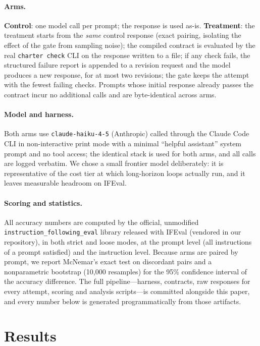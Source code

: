\documentclass{article}
\begin{document}
\paragraph{Arms.} \textbf{Control}: one model call per prompt; the response is
used as-is. \textbf{Treatment}: the treatment starts from the \emph{same}
control response (exact pairing, isolating the effect of the gate from sampling
noise); the compiled contract is evaluated by the real \texttt{charter check}
CLI on the response written to a file; if any check fails, the structured
failure report is appended to a revision request and the model produces a new
response, for at most two revisions; the gate keeps the attempt with the fewest
failing checks. Prompts whose initial response already passes the contract incur
no additional calls and are byte-identical across arms.

\paragraph{Model and harness.} Both arms use \texttt{claude-haiku-4-5} (Anthropic)
called through the Claude Code CLI in non-interactive print mode with a minimal
``helpful assistant'' system prompt and no tool access; the identical stack is
used for both arms, and all calls are logged verbatim. We chose a small frontier
model deliberately: it is representative of the cost tier at which long-horizon
loops actually run, and it leaves measurable headroom on IFEval.

\paragraph{Scoring and statistics.} All accuracy numbers are computed by the
official, unmodified \texttt{instruction\_following\_eval} library released with
IFEval (vendored in our repository), in both strict and loose modes, at the
prompt level (all instructions of a prompt satisfied) and the instruction level.
Because arms are paired by prompt, we report McNemar's exact test on discordant
pairs and a nonparametric bootstrap (10{,}000 resamples) for the 95\% confidence
interval of the accuracy difference. The full pipeline---harness, contracts, raw
responses for every attempt, scoring and analysis scripts---is committed alongside
this paper, and every number below is generated programmatically from those
artifacts.

\section{Results}
\label{sec:results}
\end{document}
